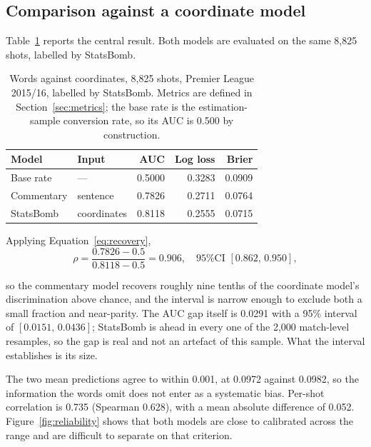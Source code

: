\documentclass[conference]{IEEEtran}
\newcommand{\num}[1]{\mbox{#1}}
\begin{document}
\subsection{Comparison against a coordinate model}
\label{sec:headline}

Table~\ref{tab:headline} reports the central result. Both models are evaluated
on the same \num{8,825} shots, labelled by StatsBomb.

\begin{table}[t]
\caption{Words against coordinates, \num{8,825} shots, Premier League
2015/16, labelled by StatsBomb. Metrics are defined in
Section~\ref{sec:metrics}; the base rate is the estimation-sample conversion
rate, so its AUC is \num{0.500} by construction.}
\label{tab:headline}
\centering
\footnotesize
\begin{tabular}{llrrr}
\toprule
Model & Input & AUC & Log loss & Brier \\
\midrule
Base rate & --- & \num{0.5000} & \num{0.3283} & \num{0.0909} \\
Commentary & sentence & \num{0.7826} & \num{0.2711} & \num{0.0764} \\
StatsBomb & coordinates & \num{0.8118} & \num{0.2555} & \num{0.0715} \\
\bottomrule
\end{tabular}
\end{table}

Applying Equation~\ref{eq:recovery},
\begin{equation}
\rho = \frac{0.7826 - 0.5}{0.8118 - 0.5} = 0.906,
\quad \text{95\% CI } [0.862,\, 0.950],
\end{equation}

\noindent
so the commentary model recovers roughly nine tenths of the coordinate model's
discrimination above chance, and the interval is narrow enough to exclude both
a small fraction and near-parity. The AUC gap itself is \num{0.0291} with a
95\% interval of $[0.0151,\, 0.0436]$; StatsBomb is ahead in every one of the
\num{2,000} match-level resamples, so the gap is real and not an artefact of
this sample. What the interval establishes is its size.

The two mean predictions agree to within \num{0.001}, at \num{0.0972} against
\num{0.0982}, so the information the words omit does not enter as a systematic
bias. Per-shot correlation is \num{0.735} (Spearman \num{0.628}), with a mean
absolute difference of \num{0.052}. Figure~\ref{fig:reliability} shows that
both models are close to calibrated across the range and are difficult to
separate on that criterion.
\end{document}
